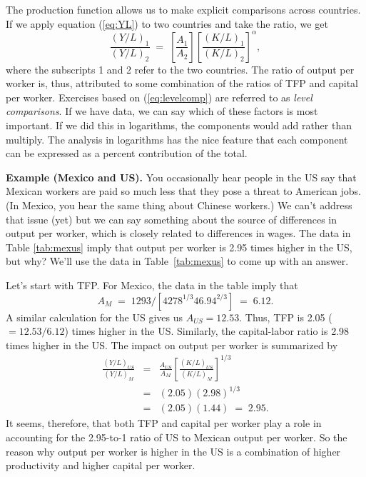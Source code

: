 The production function allows us to make explicit
comparisons across countries.  If we apply equation (\ref{eq:YL})
to two countries  and take the ratio, we get
\begin{equation}
    \frac{(Y/L)_1}{(Y/L)_2} \;=\;
             \left[ \frac{A_1}{A_2} \right]
             \left[ \frac{(K/L)_1}{(K/L)_2} \right]^\alpha ,
        \label{eq:levelcomp}
\end{equation}
where the subscripts 1 and 2 refer to the two countries.
The ratio of output per worker is, thus, attributed to
some combination of the ratios of
TFP and capital per worker.
Exercises based on (\ref{eq:levelcomp}) are referred to as
{\it level comparisons\/}.
If we have data, we can say which of these factors is most important.
If we did this in logarithms, the components would add rather than multiply. The analysis in logarithms has the nice feature that each component can be expressed as a percent contribution of the total.


\textbf{Example (Mexico and US).} You occasionally hear
people in the US say that Mexican workers are paid so much less
that they pose a threat to American jobs. (In Mexico, you hear the
same thing about Chinese workers.) We can't address that issue (yet) but we can say something about the source of differences
in output per worker, which is closely related to differences in
wages. The data in Table \ref{tab:mexus} imply that output per
worker is 2.95 times higher in the US, but why?
We'll use the data in Table~\ref{tab:mexus} to come up with an answer.

Let's start with TFP.
For Mexico, the data in the table imply that
\[
    A_M \;=\; 1293 / [ 4278^{1/3} 46.94^{2/3} ] \;=\; 6.12.
\]
A similar calculation for the US gives us $A_{US} = 12.53$.
Thus, TFP is 2.05 ($= 12.53/6.12$) times higher in the US.
Similarly, the capital-labor ratio is 2.98 times higher in the US.
The impact on output per worker is summarized by
\begin{eqnarray*}
     \frac{(Y/L)_{US}}{(Y/L)_{M}}  &=&  \frac{A_{US}}{A_M}
                        \left[ \frac{(K/L)_{US}}{(K/L)_{M}} \right]^{1/3} \\
                         &=&   (2.05) (2.98)^{1/3} \\ %
                         &=&   (2.05) (1.44) \;=\; 2.95 . %
\end{eqnarray*}
It seems, therefore, that both TFP and capital per
worker play a role in accounting for the
2.95-to-1 ratio of US to Mexican output per worker.
So the reason why output per worker is higher in the US is a
combination of higher productivity and
higher capital per worker.

